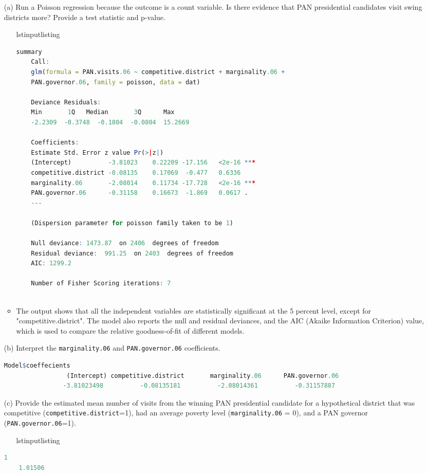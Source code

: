 \documentclass[12pt,letterpaper]{article}
\begin{document}
\begin{enumerate}
	\item [(a)]
	Run a Poisson regression because the outcome is a count variable. Is there evidence that PAN presidential candidates visit swing districts more? Provide a test statistic and p-value.
	\begin{itemize}
	\item[lstinputlisting]
	  
	 \begin{lstlisting}[language=R]	
	summary
	Call:
	glm(formula = PAN.visits.06 ~ competitive.district + marginality.06 + 
	PAN.governor.06, family = poisson, data = dat)
	
	Deviance Residuals: 
	Min       1Q   Median       3Q      Max  
	-2.2309  -0.3748  -0.1804  -0.0804  15.2669  
	
	Coefficients:
	Estimate Std. Error z value Pr(>|z|)    
	(Intercept)          -3.81023    0.22209 -17.156   <2e-16 ***
	competitive.district -0.08135    0.17069  -0.477   0.6336    
	marginality.06       -2.08014    0.11734 -17.728   <2e-16 ***
	PAN.governor.06      -0.31158    0.16673  -1.869   0.0617 .  
	---
	
	(Dispersion parameter for poisson family taken to be 1)
	
	Null deviance: 1473.87  on 2406  degrees of freedom
	Residual deviance:  991.25  on 2403  degrees of freedom
	AIC: 1299.2
	
	Number of Fisher Scoring iterations: 7
	
	\end{lstlisting}
	\item The output shows that all the independent variables are statistically significant at the 5 percent level, except for "competitive.district". The model also reports the null and residual deviances, and the AIC (Akaike Information Criterion) value, which is used to compare the relative goodness-of-fit of different models.
	\end{itemize}
	\item [(b)]
	Interpret the \texttt{marginality.06} and \texttt{PAN.governor.06} coefficients.
	 \begin{lstlisting}[language=R]	
	 	      Model$coeffecients
	 	         (Intercept) competitive.district       marginality.06      PAN.governor.06 
	 			-3.81023498          -0.08135181          -2.08014361          -0.31157887 
	 	\end{lstlisting}
	\item [(c)]
	Provide the estimated mean number of visits from the winning PAN presidential candidate for a hypothetical district that was competitive (\texttt{competitive.district}=1), had an average poverty level (\texttt{marginality.06} = 0), and a PAN governor (\texttt{PAN.governor.06}=1).
		\begin{itemize}
		\item[lstinputlisting]
		  
		\end{itemize}
		 \begin{lstlisting}[language=R]	
	      1 
	1.01506 
	\end{lstlisting}
\end{enumerate}
\end{document}
